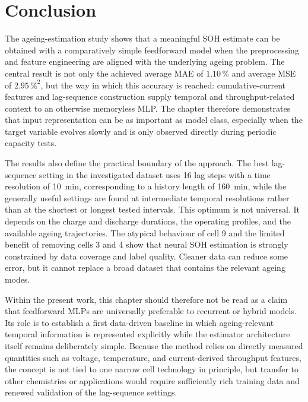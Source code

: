 \documentclass[
    a4paper,
    12pt,
    titlepage,
    bibliography=totoc,
    twoside=on,
    parskip=false,
    numbers=noenddot,
    cleardoublepage=empty,
    DIV=12,
    BCOR=12.0mm,
    headheight=36pt,
    headings=openright
]{scrreprt}
\begin{document}
\section{Conclusion}
The ageing-estimation study shows that a meaningful SOH estimate can be obtained with a comparatively simple feedforward model when the preprocessing and feature engineering are aligned with the underlying ageing problem. The central result is not only the achieved average MAE of $1.10\,\%$ and average MSE of $2.95\,\%^{2}$, but the way in which this accuracy is reached: cumulative-current features and lag-sequence construction supply temporal and throughput-related context to an otherwise memoryless MLP. The chapter therefore demonstrates that input representation can be as important as model class, especially when the target variable evolves slowly and is only observed directly during periodic capacity tests.

The results also define the practical boundary of the approach. The best lag-sequence setting in the investigated dataset uses 16 lag steps with a time resolution of \SI{10}{\minute}, corresponding to a history length of \SI{160}{\minute}, while the generally useful settings are found at intermediate temporal resolutions rather than at the shortest or longest tested intervals. This optimum is not universal. It depends on the charge and discharge durations, the operating profiles, and the available ageing trajectories. The atypical behaviour of cell 9 and the limited benefit of removing cells 3 and 4 show that neural SOH estimation is strongly constrained by data coverage and label quality. Cleaner data can reduce some error, but it cannot replace a broad dataset that contains the relevant ageing modes.

Within the present work, this chapter should therefore not be read as a claim that feedforward MLPs are universally preferable to recurrent or hybrid models. Its role is to establish a first data-driven baseline in which ageing-relevant temporal information is represented explicitly while the estimator architecture itself remains deliberately simple. Because the method relies on directly measured quantities such as voltage, temperature, and current-derived throughput features, the concept is not tied to one narrow cell technology in principle, but transfer to other chemistries or applications would require sufficiently rich training data and renewed validation of the lag-sequence settings.
\end{document}
